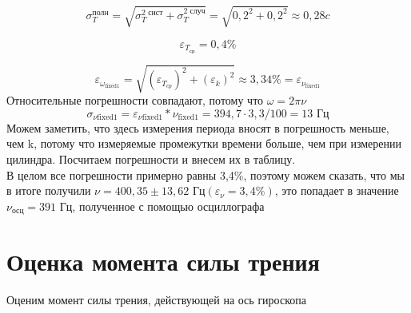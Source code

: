 \documentclass[a4paper,12pt]{article}
\begin{document}
	\begin{equation}
		\sigma_{T}^\text{полн}=\sqrt{\sigma_{T}^\text{2 сист} + \sigma_{T}^\text{2 случ}} = \sqrt{0,2^2 + 0,2^2}\approx 0,28 c
	\end{equation}
	
	\begin{equation}
		\varepsilon_{T_\text{ср}}= 0,4\%
	\end{equation}
	
	\begin{equation}
		\varepsilon_{\omega_\text{fixed1}}= \sqrt{(\varepsilon_{T_{cp}})^2 + (\varepsilon_{k})^2} \approx 3,34\% = \varepsilon_{\nu_\text{fixed1}}
	\end{equation}
	Относительные погрешности совпадают, потому что $\omega = 2\pi\nu$
	\begin{equation}
		\sigma_{\nu\text{fixed1}}=  \varepsilon_{\nu\text{fixed1}} * \nu_\text{fixed1} = 394,7\cdot3,3/100  = 13 \text{ Гц}
	\end{equation}
	Можем заметить, что здесь измерения периода вносят в погрешность меньше, чем k, потому что измеряемые промежутки времени больше, чем при измерении цилиндра. Посчитаем погрешности и внесем их в таблицу. \\
	В целом все погрешности примерно равны 3,4\%, поэтому можем сказать, что мы в итоге получили $\nu =  400,35 \pm 13,62 \text{ Гц} (\varepsilon_\nu = 3,4\%)$, это попадает в значение $\nu_{\text{осц}}=391 \text{ Гц}$, полученное с помощью осциллографа
	
	\section{Оценка момента силы трения}
	
	Оценим момент силы трения, действующей на ось гироскопа
	
\end{document}

